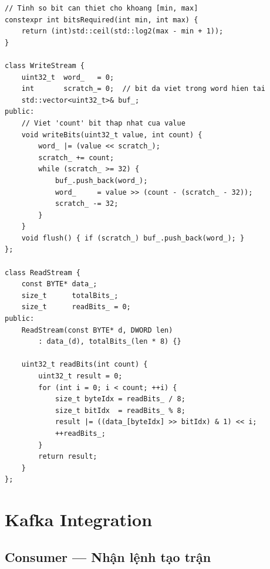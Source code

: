 \documentclass[12pt,a4paper]{report}
\begin{document}
\begin{lstlisting}[style=cppStyle, caption={WriteStream và ReadStream --- bit-packing}, label={lst:bitpacking}]
// Tinh so bit can thiet cho khoang [min, max]
constexpr int bitsRequired(int min, int max) {
    return (int)std::ceil(std::log2(max - min + 1));
}

class WriteStream {
    uint32_t  word_   = 0;
    int       scratch_= 0;  // bit da viet trong word hien tai
    std::vector<uint32_t>& buf_;
public:
    // Viet 'count' bit thap nhat cua value
    void writeBits(uint32_t value, int count) {
        word_ |= (value << scratch_);
        scratch_ += count;
        while (scratch_ >= 32) {
            buf_.push_back(word_);
            word_     = value >> (count - (scratch_ - 32));
            scratch_ -= 32;
        }
    }
    void flush() { if (scratch_) buf_.push_back(word_); }
};

class ReadStream {
    const BYTE* data_;
    size_t      totalBits_;
    size_t      readBits_ = 0;
public:
    ReadStream(const BYTE* d, DWORD len)
        : data_(d), totalBits_(len * 8) {}

    uint32_t readBits(int count) {
        uint32_t result = 0;
        for (int i = 0; i < count; ++i) {
            size_t byteIdx = readBits_ / 8;
            size_t bitIdx  = readBits_ % 8;
            result |= ((data_[byteIdx] >> bitIdx) & 1) << i;
            ++readBits_;
        }
        return result;
    }
};
\end{lstlisting}

\section{Kafka Integration}

\subsection{Consumer --- Nhận lệnh tạo trận}
\end{document}
